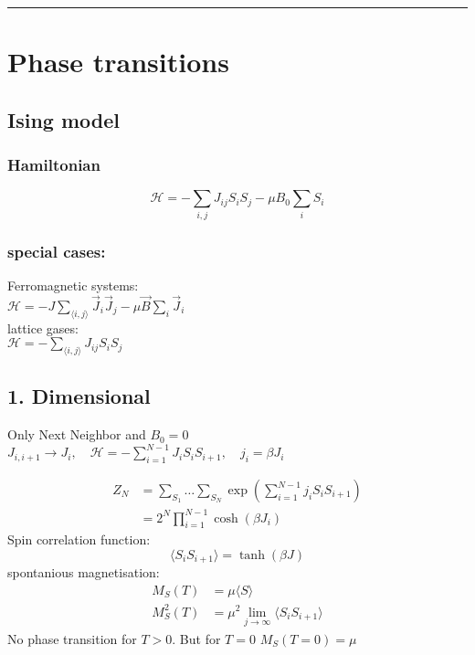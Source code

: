 \noindent\rule[1ex]{\textwidth/5}{1pt}
\section{Phase transitions}

\subsection*{Ising model}

\subsubsection*{Hamiltonian}
\begin{equation*}
    \mathcal{H} = - \sum_{i,j} J_{ij} S_i S_j - \mu B_0 \sum_i S_i
\end{equation*}

\subsubsection*{special cases:}
Ferromagnetic systems:\\
$\mathcal{H} = -J \sum_{\langle i,j \rangle} \vec{J}_i \vec{J}_j - \mu \vec{B}\sum_i \vec{J}_i$ \\
lattice gases: \\
$\mathcal{H} = -\sum_{\langle i,j \rangle} J_{ij} S_i S_j $ \\


\subsection*{1. Dimensional}
Only Next Neighbor and $B_0 = 0$ \\
$J_{i, i+1} \rightarrow J_i, \quad \mathcal{H} = - \sum_{i=1}^{N-1} J_i S_i S_{i+1}, \quad j_i = \beta J_i$

\begin{equation*}
    \begin{aligned}
        Z_N &= \sum_{S_1} \dots \sum_{S_N} \exp \left(\sum_{i=1}^{N-1} j_i S_i S_{i+1}\right) \\
            &= 2^N \prod_{i=1}^{N-1} \cosh \left( \beta J_i \right)
    \end{aligned}
\end{equation*}
Spin correlation function:
\begin{equation*}
    \langle S_i S_{i+1} \rangle = \tanh \left( \beta J \right)
\end{equation*}
spontanious magnetisation:
\begin{equation*}
    \begin{aligned}
        M_S (T) &= \mu \langle S \rangle \\
        M_S^2 (T) &= \mu^2 \lim_{j \rightarrow \infty} \langle S_i S_{i+1} \rangle
    \end{aligned}
\end{equation*}
No phase transition for $T > 0$. But for $T = 0$ $M_S(T=0) = \mu$

